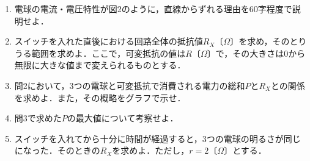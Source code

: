 \begin{enumerate}[label={問\arabic*}]
  \item 電球の電流・電圧特性が図2のように，直線からずれる理由を60字程度で説明せよ．
  \item スイッチを入れた直後における回路全体の抵抗値$R_X$〔$\Omega$〕を求め，そのとりうる範囲を求めよ．ここで，可変抵抗の値は$R$〔$\Omega$〕で，その大きさは0から無限に大きな値まで変えられるものとする．
  \item 問2において，3つの電球と可変抵抗で消費される電力の総和$P$と$R_X$との関係を求めよ．また，その概略をグラフで示せ．
  \item 問3で求めた$P$の最大値について考察せよ．
  \item スイッチを入れてから十分に時間が経過すると，3つの電球の明るさが同じになった．そのときの$R_X$を求めよ．ただし，$r = 2$〔$\Omega$〕とする．

\end{enumerate}


